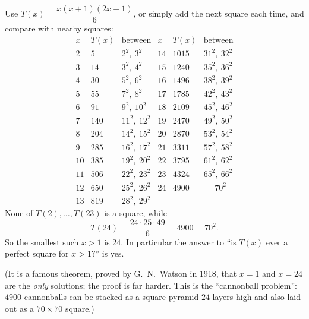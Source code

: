 Use $T(x)=\dfrac{x(x+1)(2x+1)}{6}$, or simply add the next square each time, and compare with nearby squares:
\[\begin{array}{c|c|c||c|c|c}
x & T(x) & \text{between} & x & T(x) & \text{between}\\\hline
2 & 5 & 2^2,\ 3^2 & 14 & 1015 & 31^2,\ 32^2\\
3 & 14 & 3^2,\ 4^2 & 15 & 1240 & 35^2,\ 36^2\\
4 & 30 & 5^2,\ 6^2 & 16 & 1496 & 38^2,\ 39^2\\
5 & 55 & 7^2,\ 8^2 & 17 & 1785 & 42^2,\ 43^2\\
6 & 91 & 9^2,\ 10^2 & 18 & 2109 & 45^2,\ 46^2\\
7 & 140 & 11^2,\ 12^2 & 19 & 2470 & 49^2,\ 50^2\\
8 & 204 & 14^2,\ 15^2 & 20 & 2870 & 53^2,\ 54^2\\
9 & 285 & 16^2,\ 17^2 & 21 & 3311 & 57^2,\ 58^2\\
10 & 385 & 19^2,\ 20^2 & 22 & 3795 & 61^2,\ 62^2\\
11 & 506 & 22^2,\ 23^2 & 23 & 4324 & 65^2,\ 66^2\\
12 & 650 & 25^2,\ 26^2 & 24 & 4900 & =70^2\\
13 & 819 & 28^2,\ 29^2 & & &
\end{array}\]
None of $T(2),\ldots,T(23)$ is a square, while
\[T(24)=\dfrac{24\cdot25\cdot49}{6}=4900=70^2.\]
So the smallest such $x>1$ is $\boxed{24}$. In particular the answer to ``is $T(x)$ ever a perfect square for $x>1$?'' is yes.

(It is a famous theorem, proved by G.~N.~Watson in 1918, that $x=1$ and $x=24$ are the \emph{only} solutions; the proof is far harder. This is the ``cannonball problem'': $4900$ cannonballs can be stacked as a square pyramid $24$ layers high and also laid out as a $70\times70$ square.)
